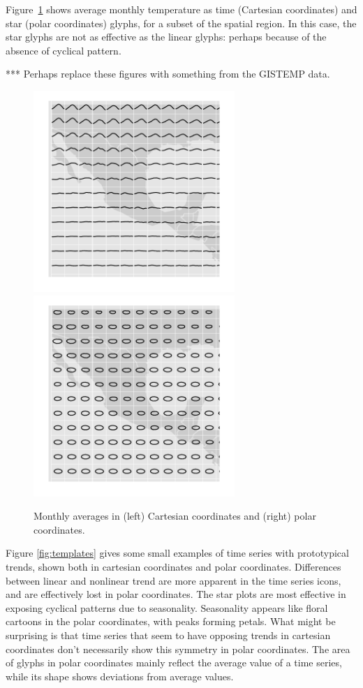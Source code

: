 \documentclass[oneside]{article}
\begin{document}
Figure~\ref{fig:cycle} shows average monthly temperature as time (Cartesian coordinates) and star (polar coordinates) glyphs, for a subset of the spatial region. In this case, the star glyphs are not as effective as the linear glyphs: perhaps because of the absence of cyclical pattern.

*** Perhaps replace these figures with something from the GISTEMP data.

\begin{figure}[htbp]
  \centering
  \includegraphics[width=3in]{month-cartesian}
  \includegraphics[width=3in]{month-polar}
    
  \caption{Monthly averages in (left) Cartesian coordinates and (right) polar coordinates.}
  
  \label{fig:cycle}
\end{figure}

Figure \ref{fig:templates} gives some small examples of time series with prototypical trends, shown both in cartesian coordinates and polar coordinates. Differences between linear and nonlinear trend are more apparent in the time series icons, and are effectively lost in polar coordinates. The star plots are most effective in exposing cyclical patterns due to seasonality. Seasonality appears like floral cartoons in the polar coordinates, with peaks forming petals. What might be surprising is that time series that seem to have opposing trends in cartesian coordinates don't necessarily show this symmetry in polar coordinates. The area of glyphs in polar coordinates mainly reflect the average value of a time series, while its shape shows deviations from average values. 
\end{document}
